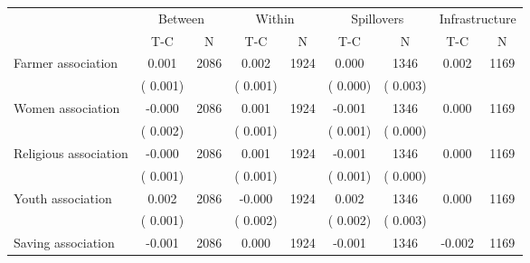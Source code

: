 
\begin{tabular}{l*{8}{c}}\hline&\multicolumn{2}{c}{Between}&\multicolumn{2}{c}{Within}&\multicolumn{2}{c}{Spillovers}&\multicolumn{2}{c}{Infrastructure}\\ \cmidrule(r){2-3}\cmidrule(l){4-5}\cmidrule(l){6-7}\cmidrule(l){8-9} & {T-C} & {N} & {T-C} & {N}  & {T-C}  & {N} & {T-C}  & {N} \\ \midrule
Farmer association        &              0.001      &       2086       &              0.002      &       1924       &              0.000      &       1346  &        0.002 &       1169       \\
                       &       (       0.001)            &                               &       (       0.001)            &                               &       (       0.000)            &       (       0.003) &                  \\
Women association        &             -0.000      &       2086       &              0.001      &       1924       &             -0.001      &       1346  &        0.000 &       1169       \\
                       &       (       0.002)            &                               &       (       0.001)            &                               &       (       0.001)            &       (       0.000) &                  \\
Religious association        &             -0.000      &       2086       &              0.001      &       1924       &             -0.001      &       1346  &        0.000 &       1169       \\
                       &       (       0.001)            &                               &       (       0.001)            &                               &       (       0.001)            &       (       0.000) &                  \\
Youth association        &              0.002      &       2086       &             -0.000      &       1924       &              0.002      &       1346  &        0.000 &       1169       \\
                       &       (       0.001)            &                               &       (       0.002)            &                               &       (       0.002)            &       (       0.003) &                  \\
Saving association        &             -0.001      &       2086       &              0.000      &       1924       &             -0.001      &       1346  &       -0.002 &       1169       \\

\end{tabular}
